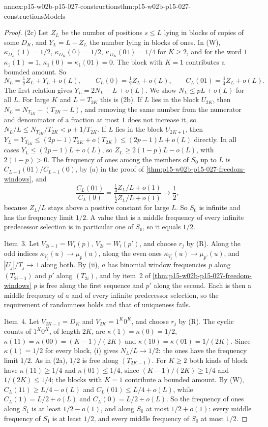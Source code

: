 \begin{annexitem}{annex:p15-w02b-p15-027-constructions}{thm:p15-w02b-p15-027-constructions}{Models}
\begin{proof}
(2c) Let \(Z_L\) be the number of positions \(s\leq L\) lying in blocks of
copies of some \(D_K\), and \(Y_L=L-Z_L\) the number lying in blocks of
ones. In (W), \(\kappa_{D_K}(1)=1/2\), \(\kappa_{D_K}(0)=1/2\),
\(\kappa_{D_K}(01)=1/4\) for \(K\geq2\), and for the word \(1\)
\(\kappa_1(1)=1\), \(\kappa_1(0)=\kappa_1(01)=0\). The block with \(K=1\)
contributes a bounded amount. So
\[
 N_L=\tfrac12Z_L+Y_L+o(L),\qquad C_L(0)=\tfrac12Z_L+o(L),\qquad
 C_L(01)=\tfrac14Z_L+o(L).
\]
The first relation gives \(Y_L=2N_L-L+o(L)\). We show
\(N_L\leq pL+o(L)\) for all \(L\). For large \(K\) and \(L=T_{2K}\) this is
(2b). If \(L\) lies in the block \(U_{2K}\), then
\(N_L=N_{T_{2K}}-(T_{2K}-L)\), and removing the same number from the
numerator and denominator of a fraction at most \(1\) does not increase
it, so \(N_L/L\leq N_{T_{2K}}/T_{2K}<p+1/T_{2K}\). If \(L\) lies in the
block \(U_{2K+1}\), then \(Y_L=Y_{T_{2K}}\leq(2p-1)T_{2K}+o(T_{2K})\leq
(2p-1)L+o(L)\) directly. In all cases \(Y_L\leq(2p-1)L+o(L)\), so
\(Z_L\geq2(1-p)L-o(L)\), with \(2(1-p)>0\). The frequency of ones among
the members of \(S_0\) up to \(L\) is \(C_{L-1}(01)/C_{L-1}(0)\), by (a) in
the proof of \cref{thm:p15-w02b-p15-027-freedom-windows}, and
\[
 \frac{C_{L}(01)}{C_{L}(0)}=\frac{\tfrac14Z_L/L+o(1)}{\tfrac12Z_L/L+o(1)}\longrightarrow\frac12,
\]
because \(Z_L/L\) stays above a positive constant for large \(L\). So
\(S_0\) is infinite and has the frequency limit \(1/2\). A value that is
a middle frequency of every infinite predecessor selection is in
particular one of \(S_0\), so it equals \(1/2\).

Item~3. Let \(V_{2i-1}=W_i(p)\), \(V_{2i}=W_i(p')\), and choose \(r_j\) by
(R). Along the odd indices \(\kappa_{V_j}(u)\to\mu_p(u)\), along the even
ones \(\kappa_{V_j}(u)\to\mu_{p'}(u)\), and \(|U_j|/T_j\to1\) along both.
By (ii), \(a\) has binomial window frequencies \(p\) along
\((T_{2i-1})\) and \(p'\) along \((T_{2i})\), and by item~2 of
\cref{thm:p15-w02b-p15-027-freedom-windows} \(p\) is free along the
first sequence and \(p'\) along the second. Each is then a middle
frequency of \(a\) and of every infinite predecessor selection, so the
requirement of randomness holds and that of uniqueness fails.

Item~4. Let \(V_{2K-1}=D_K\) and \(V_{2K}=1^K0^K\), and choose \(r_j\) by
(R). The cyclic counts of \(1^K0^K\), of length \(2K\), are
\(\kappa(1)=\kappa(0)=1/2\), \(\kappa(11)=\kappa(00)=(K-1)/(2K)\) and
\(\kappa(10)=\kappa(01)=1/(2K)\). Since \(\kappa(1)=1/2\) for every
block, (i) gives \(N_L/L\to1/2\): the ones have the frequency limit
\(1/2\). As in (2a), \(1/2\) is free along \((T_{2K-1})\). For \(K\geq2\)
both kinds of block have \(\kappa(11)\geq1/4\) and \(\kappa(01)\leq1/4\),
since \((K-1)/(2K)\geq1/4\) and \(1/(2K)\leq1/4\); the blocks with \(K=1\)
contribute a bounded amount. By (W), \(C_L(11)\geq L/4-o(L)\) and
\(C_L(01)\leq L/4+o(L)\), while \(C_L(1)=L/2+o(L)\) and
\(C_L(0)=L/2+o(L)\). So the frequency of ones along \(S_1\) is at least
\(1/2-o(1)\), and along \(S_0\) at most \(1/2+o(1)\): every middle
frequency of \(S_1\) is at least \(1/2\), and every middle frequency of
\(S_0\) at most \(1/2\).


\end{proof}
\end{annexitem}
